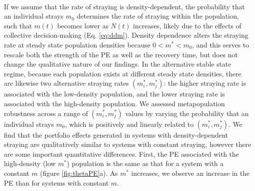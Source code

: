 \documentclass{revtex4}
\begin{document}
 \\
If we assume that the rate of straying is density-dependent, the probability that an individual strays $m_0$ determines the rate of straying within the population, such that $m(t)$ becomes lower as $N(t)$ increases, likely due to the effects of collective decision-making \citep{Berdahl:2016dx} (Eq. \ref{eq:ddm}).
Density dependence alters the straying rate at steady state population densities because $0 < m^* < m_0$, and this serves to rescale both the strength of the PE as well as the recovery time, but does not change the qualitative nature of our findings.
In the alternative stable state regime, because each population exists at different steady state densities, there are likewise two alternative straying rates $(m_i^*,m_j^*)$: the higher straying rate is associated with the low-density population, and the lower straying rate is associated with the high-density population.
We assessed metapopulation robustness across a range of $(m_i^*,m_j^*)$ values by varying the probability that an individual strays $m_0$, which is positively and linearly related to $(m_i^*,m_j^*)$.
We find that the portfolio effects generated in systems with density-dependent straying are qualitatively similar to systems with constant straying, however there are some important quantitative differences.
First, the PE associated with the high-density (low $m^*$) population is the same as that for a system with a constant $m$ (figure \ref{fig:thetaPE}a).
As $m^*$ increases, we observe an increase in the PE than for systems with constant $m$.
\end{document}
